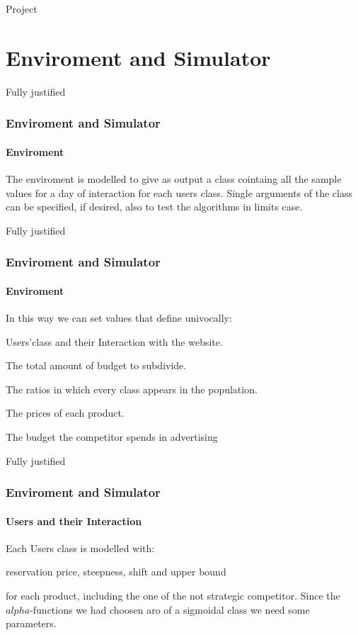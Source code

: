 \documentclass{beamer}
\begin{document}
\frame{\titlepage}




\begin{frame}{Project}
    \tableofcontents[hideallsubsections]
\end{frame}

\AtBeginSection[ ]
{
\begin{frame}{}
    \tableofcontents[currentsection]
\end{frame}
}
\section{Enviroment and Simulator}
 
\begin{frame}{Fully justified}
\frametitle{Enviroment and Simulator}
\framesubtitle{Enviroment}
The enviroment is modelled to give as output a class cointaing all the sample values for a day of interaction for each users class.
Single arguments of the class can be specified, if desired, also to test the algorithms in limits case.
\end {frame}

\begin{frame}{Fully justified}
\frametitle{Enviroment and Simulator}
\framesubtitle{Enviroment}
In this way we can set values that define univocally:
\vspace{0.5cm}
\begin{list}{-}{\setlength{\itemsep}{0.5cm}}
    \item Users'class and their Interaction with the website.
    \item The total amount of budget to subdivide.
    \item The ratios in which every class appears in the population.
    \item The prices of each product.
    \item The budget the competitor spends in advertising
\end{list}
\end {frame}

\begin {frame}{Fully justified}
\frametitle{Enviroment and Simulator}
\framesubtitle{Users and their Interaction}
Each Users class is modelled with:
\begin{block}{ reservation price, steepness, shift and upper bound} \end{block}
for each product, including the one of the not strategic competitor.
Since the $alpha$-functions we had choosen aro of a sigmoidal class we need some parameters.
\end {frame}
\end{document}
